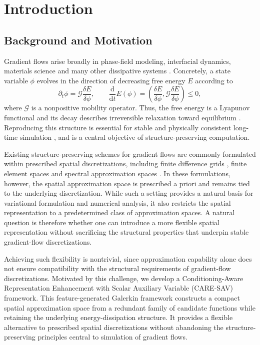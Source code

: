 \documentclass[10pt,reqno]{amsart}
\theoremstyle{remark}
\theoremstyle{definition}
\begin{document}
\section{Introduction}

\subsection{Background and Motivation}
Gradient flows arise broadly in phase-field modeling, interfacial dynamics, materials science and many other dissipative systems \cite{SHENDecoupled2014,SHEN2015617,YANG20171116,Celledoni2018SISC}. Concretely, a state variable $\phi$ evolves in the direction of decreasing free energy $E$ according to
\begin{equation}
  \partial_t\phi=\mathcal G\frac{\delta E}{\delta\phi},
  \qquad
  \frac{\mathrm d}{\mathrm dt}E(\phi)=\left(\frac{\delta E}{\delta\phi},\mathcal G\frac{\delta E}{\delta\phi}\right)\le0,
  \label{eq:intro-gradient-flow}
\end{equation}
where $\mathcal G$ is a nonpositive mobility operator. Thus, the free energy is a Lyapunov functional and its decay describes irreversible relaxation toward equilibrium \cite{SHEN2018407,Tang2019SISC}. Reproducing this structure is essential for stable and physically consistent long-time simulation \cite{Shen-Phase-Field2010,GOMEZ20115310,Li2024SISC}, and is a central objective of structure-preserving computation.

Existing structure-preserving schemes for gradient flows are commonly formulated within prescribed spatial discretizations, including finite difference grids \cite{WiseFDM2009}, finite element spaces \cite{GaoFEM2018} and spectral approximation spaces \cite{LiShen2020SAV}. In these formulations, however, the spatial approximation space is prescribed a priori and remains tied to the underlying discretization. While such a setting provides a natural basis for variational formulation and numerical analysis, it also restricts the spatial representation to a predetermined class of approximation spaces. A natural question is therefore whether one can introduce a more flexible spatial representation without sacrificing the structural properties that underpin stable gradient-flow discretizations.

Achieving such flexibility is nontrivial, since approximation capability alone does not ensure compatibility with the structural requirements of gradient-flow discretizations. Motivated by this challenge, we develop a Conditioning-Aware Representation Enhancement with Scalar Auxiliary Variable (CARE-SAV) framework. This feature-generated Galerkin framework constructs a compact spatial approximation space from a redundant family of candidate functions while retaining the underlying energy-dissipation structure. It provides a flexible alternative to prescribed spatial discretizations without abandoning the structure-preserving principles central to simulation of gradient flows.
\end{document}
